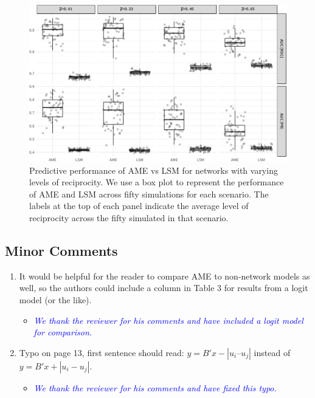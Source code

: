 \begin{enumerate}
\begin{itemize}
\begin{itemize}
{{				}}
			\end{itemize}	
			\begin{figure}[ht]
				\centering
				\includegraphics[width=1\textwidth]{sim2Viz.pdf}
				\caption{Predictive performance of AME vs LSM for networks with varying levels of reciprocity. We use a box plot to represent the performance of AME and LSM across fifty simulations for each scenario. The labels at the top of each panel indicate the average level of reciprocity across the fifty simulated in that scenario.}
				\label{fig:sim_recip}		
			\end{figure}
	\end{itemize}
\end{enumerate}

\subsection{Minor Comments}

\begin{enumerate}
	\item It would be helpful for the reader to compare AME to non-network models as well, so the authors could include a column in Table 3 for results from a logit model (or the like). 
	\begin{itemize}
		\item \textcolor{blue}{ \emph{
		We thank the reviewer for his comments and have included a logit model for comparison.
		}}
	\end{itemize}		
	\item Typo on page 13, first sentence should read: $y = B'x - |u_i – u_j|$ instead of $y = B'x + |u_i - u_j|$.
	\begin{itemize}
		\item \textcolor{blue}{ \emph{
		We thank the reviewer for his comments and have fixed this typo.
		}}
	\end{itemize}		
\end{enumerate}

